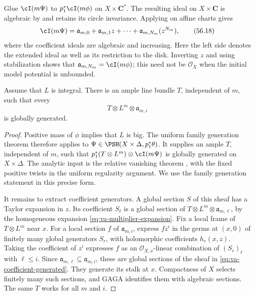 Glue $\cI(m\Psi)$ to $p_1^*\cI(m\phi)$ on $X\times\mathbf C^*$.
The resulting ideal on $X\times\mathbf C$ is algebraic by
 and retains its circle invariance.
Applying  on affine charts gives
\[
 \cI(m\Psi)=
 \mathfrak a_{m,0}+\mathfrak a_{m,1}z+\cdots
             +\mathfrak a_{m,N_m}(z^{N_m}),
\tag{56.18}\label{eq:va-multiplier-expansion}
\]
where the coefficient ideals are algebraic and increasing.
Here the left side denotes the extended ideal as well as its
restriction to the disk. Inverting $z$ and using stabilization shows
that $\mathfrak a_{m,N_m}=\cI(m\phi)$; this need not be
$\mathcal O_X$ when the initial model potential is unbounded.

\begin{lemma}\label{lem:va-family-generation}
Assume that $L$ is integral. There is an ample line bundle $T$,
independent of $m$, such that every
\[
                    T\otimes L^m\otimes\mathfrak a_{m,i}
\tag{56.19}\label{eq:va-coefficient-generated}
\]
is globally generated.
\end{lemma}

\begin{proof}
Positive mass of $\phi$ implies that $L$ is big. The uniform family
generation theorem \cite[Lemma~3.9]{DXZ23} therefore applies to
$\Psi\in\PSH(X\times\Delta,p_1^*\theta)$.
It supplies an ample $T$, independent of $m$, such that
$p_1^*(T\otimes L^m)\otimes\cI(m\Psi)$ is globally generated
on $X\times\Delta$. The analytic input is the relative vanishing
theorem \cite[Theorem~1.7]{Mat16}, with the fixed positive twists
in the uniform regularity argument. We use the family generation
statement in this precise form.

It remains to extract coefficient generators. A global section $S$
of this sheaf has a Taylor expansion in $z$. Its coefficient $S_\ell$
is a global section of $T\otimes L^m\otimes\mathfrak a_{m,\ell}$,
by the homogeneous expansion \eqref{eq:va-multiplier-expansion}.
Fix a local frame of $T\otimes L^m$ near $x$. For a local
section $f$ of $\mathfrak a_{m,i}$, express
$fz^i$ in the germs at $(x,0)$ of finitely many global generators
$S_r$, with holomorphic coefficients $h_r(x,z)$.
Taking the coefficient of $z^i$ expresses $f$ as an
$\mathcal O_{X,x}$-linear combination of $(S_r)_\ell$ with
$\ell\leq i$. Since
$\mathfrak a_{m,\ell}\subseteq\mathfrak a_{m,i}$, these are
global sections of the sheaf in \eqref{eq:va-coefficient-generated}.
They generate its stalk at $x$. Compactness of $X$ selects finitely
many such sections, and GAGA identifies them with algebraic sections.
The same $T$ works for all $m$ and $i$.
\end{proof}

